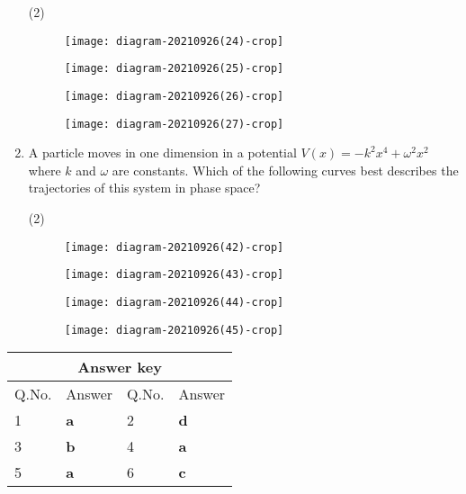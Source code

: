 \begin{enumerate}
	{}
\begin{tasks}(2)
	\task[\textbf{A.}]\begin{figure}[H]
		\centering
		\texttt{[image: diagram-20210926(24)-crop]}
	\end{figure}
	\task[\textbf{B.}]\begin{figure}[H]
		\centering
		\texttt{[image: diagram-20210926(25)-crop]}
	\end{figure}
	\task[\textbf{C.}]\begin{figure}[H]
		\centering
		\texttt{[image: diagram-20210926(26)-crop]}
	\end{figure}
	\task[\textbf{D.}]\begin{figure}[H]
		\centering
		\texttt{[image: diagram-20210926(27)-crop]}
	\end{figure}
\end{tasks}
	\item A particle moves in one dimension in a potential $V(x)=-k^{2} x^{4}+\omega^{2} x^{2}$ where $k$ and $\omega$ are constants. Which of the following curves best describes the trajectories of this system in phase space?
	{}
\begin{tasks}(2)
	\task[\textbf{A.}]\begin{figure}[H]
		\centering
		\texttt{[image: diagram-20210926(42)-crop]}
	\end{figure}
	\task[\textbf{B.}]\begin{figure}[H]
		\centering
		\texttt{[image: diagram-20210926(43)-crop]}
	\end{figure}
	\task[\textbf{C.}]\begin{figure}[H]
		\centering
		\texttt{[image: diagram-20210926(44)-crop]}
	\end{figure}
	\task[\textbf{D.}]\begin{figure}[H]
		\centering
		\texttt{[image: diagram-20210926(45)-crop]}
	\end{figure}
\end{tasks}
\end{enumerate}
\setlength\arrayrulewidth{1pt}
\begin{table}[H]
	\centering
	
	\begin{tabular}{|p{1.5cm}|p{1.5cm}||p{1.5cm}|p{1.5cm}|}
		\hline
		\multicolumn{4}{|c|}{\textbf{Answer key}}\\\hline\hline
		\rowcolor{ocrel}Q.No.&Answer&Q.No.&Answer\\\hline
		1&\textbf{a}&2&\textbf{d}\\\hline
		3&\textbf{b}&4&\textbf{a}\\\hline
		5&\textbf{a}&6&\textbf{c}\\\hline
	\end{tabular}
\end{table}
